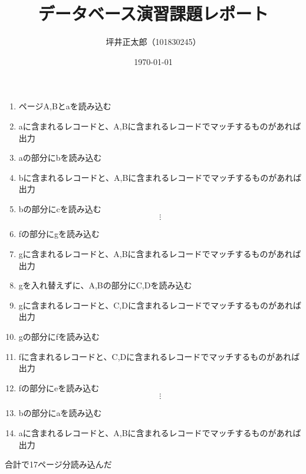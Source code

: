 \documentclass[a4paper,10pt]{jsarticle}
\begin{document}
\title{データベース演習課題レポート}
\author{坪井正太郎（101830245）}
\date{\today}
\maketitle
\begin{enumerate}
  \item ページA,Bとaを読み込む\\

  \item aに含まれるレコードと、A,Bに含まれるレコードでマッチするものがあれば出力
  \item aの部分にbを読み込む
  \item bに含まれるレコードと、A,Bに含まれるレコードでマッチするものがあれば出力
  \item bの部分にcを読み込む\\
  \[\vdots \]
  \item fの部分にgを読み込む
  \item gに含まれるレコードと、A,Bに含まれるレコードでマッチするものがあれば出力\\

  \item gを入れ替えずに、A,Bの部分にC,Dを読み込む
  \item gに含まれるレコードと、C,Dに含まれるレコードでマッチするものがあれば出力
  \item gの部分にfを読み込む
  \item fに含まれるレコードと、C,Dに含まれるレコードでマッチするものがあれば出力
  \item fの部分にeを読み込む\\
  \[\vdots \]
  \item bの部分にaを読み込む
  \item aに含まれるレコードと、A,Bに含まれるレコードでマッチするものがあれば出力
\end{enumerate}

合計で17ページ分読み込んだ
\end{document}
